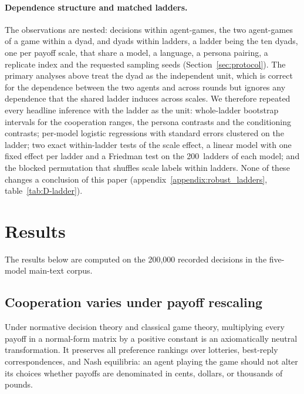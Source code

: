 \documentclass[11pt,a4paper]{article}
\newcommand{\rev}[1]{{\color{red}#1}}
\newcommand{\rev}[1]{#1}
\begin{document}
\rev{\paragraph{Dependence structure and matched ladders.} The observations are
nested: decisions within agent-games, the two agent-games of a game within a
dyad, and dyads within ladders, a ladder being the ten dyads, one per payoff
scale, that share a model, a language, a persona pairing, a replicate index
and the requested sampling seeds (Section~\ref{sec:protocol}). The primary
analyses above treat the dyad as the independent unit, which is correct for
the dependence between the two agents and across rounds but ignores any
dependence that the shared ladder induces across scales. We therefore repeated
every headline inference with the ladder as the unit: whole-ladder bootstrap
intervals for the cooperation ranges, the persona contrasts and the
conditioning contrasts; per-model logistic regressions with standard errors
clustered on the ladder; two exact within-ladder tests of the scale effect, a
linear model with one fixed effect per ladder and a Friedman test on the
200~ladders of each model; and the blocked permutation that shuffles scale labels
within ladders. None of these changes a conclusion of this paper
(appendix~\ref{appendix:robust_ladders}, table~\ref{tab:D-ladder}).}


\section{Results}\label{sec:results}

The results below are computed on the 200{,}000 recorded decisions in the
five-model main-text corpus.

\subsection{Cooperation varies under payoff rescaling }\label{sec:payoff_magnitude}

Under normative decision theory and classical game theory, multiplying every
payoff in a normal-form matrix by a positive constant is an axiomatically
neutral transformation. It preserves all preference rankings over lotteries,
best-reply correspondences, and Nash equilibria: an agent playing the game
should not alter its choices whether payoffs are denominated in cents, dollars,
or thousands of pounds.
\end{document}
